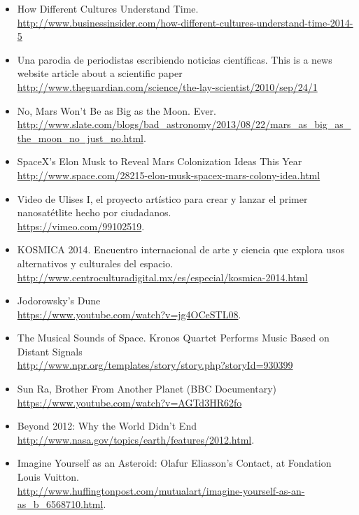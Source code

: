 \documentclass[letterpaper,10pt,onecolumn]{article}
\begin{document}
\begin{itemize}
\item How Different Cultures Understand Time. \\
\url{http://www.businessinsider.com/how-different-cultures-understand-time-2014-5} \\[-0.6cm]
\item Una parodia de periodistas escribiendo noticias
  cient\'ificas. This is a news website article about a scientific
  paper\\\url{http://www.theguardian.com/science/the-lay-scientist/2010/sep/24/1} \\[-0.6cm]
\item No, Mars Won't Be as Big as the Moon. Ever.\\
\url{http://www.slate.com/blogs/bad_astronomy/2013/08/22/mars_as_big_as_the_moon_no_just_no.html}.\\[-0.6cm]
\item SpaceX's Elon Musk to Reveal Mars Colonization Ideas This
  Year\\\url{http://www.space.com/28215-elon-musk-spacex-mars-colony-idea.html} \\[-0.6cm]
\item Video de Ulises I, el proyecto art\'istico para crear y lanzar
  el primer nanosat\'etlite hecho por
  ciudadanos.\\ \url{https://vimeo.com/99102519}.\\[-0.6cm]
\item KOSMICA 2014. Encuentro internacional de arte y ciencia que
  explora usos alternativos y culturales del
  espacio.\\ \url{http://www.centroculturadigital.mx/es/especial/kosmica-2014.html} \\[-0.6cm]
\item Jodorowsky's Dune\\\url{https://www.youtube.com/watch?v=jg4OCeSTL08}.\\[-0.6cm]
\item The Musical Sounds of Space. Kronos Quartet Performs Music Based
  on Distant  Signals\\
  \url{http://www.npr.org/templates/story/story.php?storyId=930399}\\[-0.6cm]
\item Sun Ra, Brother From Another Planet (BBC Documentary)\\
  \url{https://www.youtube.com/watch?v=AGTd3HR62fo} \\[-0.6cm]
\item Beyond 2012: Why the World Didn't End\\
  \url{http://www.nasa.gov/topics/earth/features/2012.html}. \\[-0.6cm]
\item Imagine Yourself as an Asteroid: Olafur Eliasson's Contact, at
  Fondation Louis
  Vuitton. \\\url{http://www.huffingtonpost.com/mutualart/imagine-yourself-as-an-as_b_6568710.html}. \\[-0.6cm] 
\end{itemize}
\end{document}
